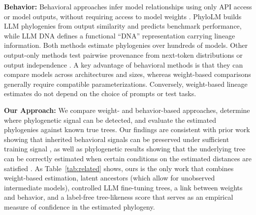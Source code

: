 \textbf{Behavior:} Behavioral approaches infer model relationships using only API access or model outputs, without requiring access to model weights \citep{yax2025phylolm,wu2026llmdna}. PhyloLM \citep{yax2025phylolm} builds LLM phylogenies from output similarity and predicts benchmark performance, while LLM DNA \citep{wu2026llmdna} defines a functional ``DNA'' representation carrying lineage information. Both methods estimate phylogenies over hundreds of models. Other output-only methods test pairwise provenance from next-token distributions \citep{nikolic2026model} or output independence \citep{zhu2025independence}. A key advantage of behavioral methods is that they can compare models across architectures and sizes, whereas weight-based comparisons generally require compatible parameterizations. Conversely, weight-based lineage estimates do not depend on the choice of prompts or test tasks.

\textbf{Our Approach:} We compare weight- and behavior-based approaches, determine where phylogenetic signal can be detected, and evaluate the estimated phylogenies against known true trees. Our findings are consistent with prior work showing that inherited behavioral signals can be preserved under sufficient training signal \citep{cloud2025subliminal}, as well as phylogenetic results showing that the underlying tree can be correctly estimated when certain conditions on the estimated distances are satisfied \citep{atteson1999performance}.  As Table~\ref{tab:related} shows, ours is the only work that combines weight-based estimation, latent ancestors (which allow for unobserved intermediate models), controlled LLM fine-tuning trees, a link between weights and behavior, and a label-free tree-likeness score that serves as an empirical measure of confidence in the estimated phylogeny.

